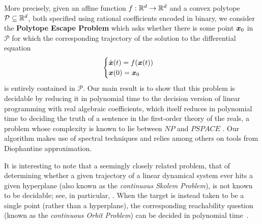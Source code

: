 More precisely, given an affine function
$f:\mathbb{R}^{d}\rightarrow \mathbb{R}^{d}$ and a convex polytope
$\mathcal{P}\subseteq\mathbb{R}^d$, both specified using rational
coefficients encoded in binary, we consider the \textbf{Polytope
  Escape Problem} which asks whether there is some point
$\boldsymbol{x}_0$ in $\mathcal{P}$ for which the corresponding
trajectory of the solution to the differential equation
\begin{equation*}
\begin{displaystyle} \begin{cases}
\dot{\myvector{x}}(t)=f(\myvector{x}(t)) \\
\myvector{x}(0)=\myvector{x}_{0}
\end{cases} \end{displaystyle}
\end{equation*}
is entirely contained in $\mathcal{P}$. Our main result is to show
that this problem is decidable by reducing it in polynomial time to
the decision version of linear programming with real algebraic
coefficients, which itself reduces in polynomial time to deciding the
truth of a sentence in the first-order theory of the reals, a problem
whose complexity is known to lie between $\mathit{NP}$ and
$\mathit{PSPACE}$ \cite{Canny88}. Our algorithm makes use of spectral
techniques and relies among others on tools from Diophantine
approximation.

It is interesting to note that a seemingly closely related problem,
that of determining whether a given trajectory of a linear dynamical
system ever hits a given hyperplane (also known as the
\emph{continuous Skolem Problem}), is not known to be decidable; see,
in particular, \cite{BellDJB10,COW16a:ICALP16,COW16b:LICS16}. When the
target is instead taken to be a single point (rather than a
hyperplane), the corresponding reachability question (known as the
\emph{continuous Orbit Problem}) can be decided in polynomial
time~\cite{Hainry08}.
